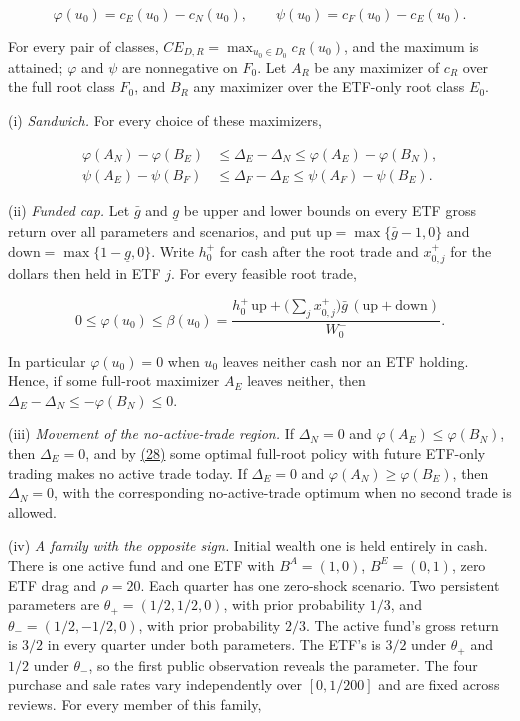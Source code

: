 \documentclass[11pt]{article}
\begin{document}
\begin{equation*}
\varphi(u_0)=c_E(u_0)-c_N(u_0),\qquad
\psi(u_0)=c_F(u_0)-c_E(u_0).\tag{56}\label{eq:56}
\end{equation*}

For every pair of classes,
\(CE_{D,R}=\max_{u_0\in D_0}c_R(u_0)\), and the maximum is
attained; \(\varphi\) and \(\psi\) are nonnegative on
\(F_0\). Let \(A_R\) be any maximizer of \(c_R\) over the
full root class \(F_0\), and \(B_R\) any maximizer over the
ETF-only root class \(E_0\).

(i) \emph{Sandwich.} For every choice of these maximizers,

\begin{equation*}
\begin{aligned}
\varphi(A_N)-\varphi(B_E)
 &\leq\Delta_E-\Delta_N\leq
 \varphi(A_E)-\varphi(B_N),\\
\psi(A_E)-\psi(B_F)
 &\leq\Delta_F-\Delta_E\leq
 \psi(A_F)-\psi(B_E).
\end{aligned}\tag{57}\label{eq:57}
\end{equation*}

(ii) \emph{Funded cap.} Let \(\bar g\) and \(\underline g\) be
upper and lower bounds on every ETF gross return over all
parameters and scenarios, and put
\(\mathrm{up}=\max\{\bar g-1,0\}\) and
\(\mathrm{down}=\max\{1-\underline g,0\}\). Write
\(h_0^+\) for cash after the root trade and \(x_{0,j}^+\) for
the dollars then held in ETF \(j\). For every feasible root
trade,

\begin{equation*}
0\leq\varphi(u_0)\leq\beta(u_0)
 =\frac{h_0^+\,\mathrm{up}
   +\bigl(\sum_jx_{0,j}^+\bigr)\bar g\,
    (\mathrm{up}+\mathrm{down})}{W_0^-}.\tag{58}\label{eq:58}
\end{equation*}

In particular \(\varphi(u_0)=0\) when \(u_0\) leaves neither
cash nor an ETF holding. Hence, if some full-root maximizer
\(A_E\) leaves neither, then
\(\Delta_E-\Delta_N\leq-\varphi(B_N)\leq0\).

(iii) \emph{Movement of the no-active-trade region.} If
\(\Delta_N=0\) and \(\varphi(A_E)\leq\varphi(B_N)\), then
\(\Delta_E=0\), and by \hyperref[eq:28]{(28)} some optimal full-root policy with
future ETF-only trading makes no active trade today. If
\(\Delta_E=0\) and \(\varphi(A_N)\geq\varphi(B_E)\), then
\(\Delta_N=0\), with the corresponding no-active-trade optimum
when no second trade is allowed.

(iv) \emph{A family with the opposite sign.} Initial wealth one is
held entirely in cash. There is one active fund and one ETF with
\(B^A=(1,0)\), \(B^E=(0,1)\), zero ETF drag and
\(\rho=20\). Each quarter has one zero-shock scenario. Two
persistent parameters are \(\theta_+=(1/2,1/2,0)\), with prior
probability \(1/3\), and \(\theta_-=(1/2,-1/2,0)\), with prior
probability \(2/3\). The active fund's gross return is \(3/2\)
in every quarter under both parameters. The ETF's is \(3/2\)
under \(\theta_+\) and \(1/2\) under \(\theta_-\), so the first
public observation reveals the parameter. The four purchase and
sale rates vary independently over \([0,1/200]\) and are fixed
across reviews. For every member of this family,
\end{document}
